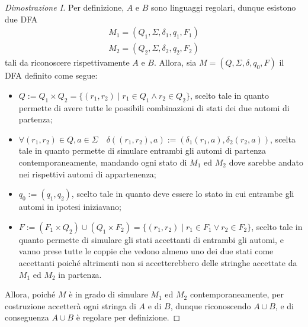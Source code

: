 \documentclass[a4paper, 12pt]{report}
\begin{document}
    \begin{proof}[Dimostrazione I]
        Per definizione, $A$ e $B$ sono linguaggi regolari, dunque esistono due DFA $$\left. \begin{array}{c}M_1 = (Q_1, \Sigma, \delta_1, q_1, F_1) \\ M_2 = (Q_2, \Sigma, \delta_2, q_2, F_2)\end{array} \right.$$ tali da riconoscere rispettivamente $A$ e $B$. Allora, sia $M = (Q, \Sigma, \delta, q_0, F)$ il DFA definito come segue:

        \begin{itemize}
            \item $Q := Q_1 \times Q_2 = \{(r_1, r_2) \mid r_1 \in Q_1 \land r_2 \in Q_2\}$, scelto tale in quanto permette di avere tutte le possibili combinazioni di stati dei due automi di partenza;
            \item $\forall (r_1, r_2) \in Q, a \in \Sigma \quad \delta((r_1, r_2), a) := (\delta_1(r_1, a), \delta_2(r_2, a))$, scelta tale in quanto permette di simulare entrambi gli automi di partenza contemporaneamente, mandando ogni stato di $M_1$ ed $M_2$ dove sarebbe andato nei rispettivi automi di appartenenza;
            \item $q_0 := (q_1, q_2)$, scelto tale in quanto deve essere lo stato in cui entrambe gli automi in ipotesi iniziavano;
            \item $F := (F_1 \times Q_2) \cup (Q_1 \times F_2) = \{(r_1, r_2) \mid r_1 \in F_1 \lor r_2 \in F_2\}$, scelto tale in quanto permette di simulare gli stati accettanti di entrambi gli automi, e vanno prese tutte le coppie che vedono almeno uno dei due stati come accettanti poiché altrimenti non si accetterebbero delle stringhe accettate da $M_1$ ed $M_2$ in partenza.
        \end{itemize}

        Allora, poiché $M$ è in grado di simulare $M_1$ ed $M_2$ contemporaneamente, per costruzione accetterà ogni stringa di $A$ e di $B$, dunque riconoscendo $A \cup B$, e di conseguenza $A \cup B$ è regolare per definizione.
    \end{proof}
\end{document}
